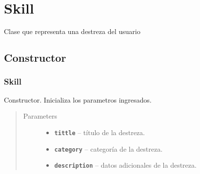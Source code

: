 \documentclass[letterpaper,10pt,english]{sphinxmanual}
\begin{document}
\section{Skill}
\label{Model/Skill:skill}\label{Model/Skill::doc}

\begin{fulllineitems}
\label{Model/Skill:com.fiuba.tallerii.jobify.Skill}
Clase que representa una destreza del usuario

\end{fulllineitems}



\subsection{Constructor}
\label{Model/Skill:constructor}

\subsubsection{Skill}
\label{Model/Skill:id1}

\begin{fulllineitems}
\label{Model/Skill:com.fiuba.tallerii.jobify.Skill.Skill(String, String, String)}
Constructor. Inicializa los parametros ingresados.
\begin{quote}\begin{description}
\item[{Parameters}] \leavevmode\begin{itemize}
\item {} 
\textbf{\texttt{tittle}} -- título de la destreza.

\item {} 
\textbf{\texttt{category}} -- categoría de la destreza.

\item {} 
\textbf{\texttt{description}} -- datos adicionales de la destreza.

\end{itemize}

\end{description}\end{quote}

\end{fulllineitems}
\end{document}
